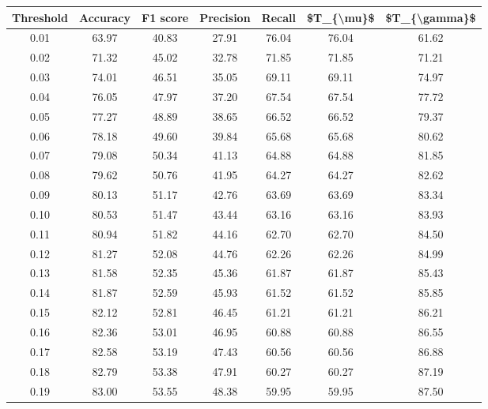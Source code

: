 \begin{tabular}{|c|c|c|c|c|c|c|}
\toprule
 Threshold &  Accuracy &  F1 score &  Precision &  Recall &  \$T\_\{\textbackslash mu\}\$ &  \$T\_\{\textbackslash gamma\}\$ \\
\hline
      0.01 &     63.97 &     40.83 &      27.91 &   76.04 &      76.04 &         61.62 \\
      0.02 &     71.32 &     45.02 &      32.78 &   71.85 &      71.85 &         71.21 \\
      0.03 &     74.01 &     46.51 &      35.05 &   69.11 &      69.11 &         74.97 \\
      0.04 &     76.05 &     47.97 &      37.20 &   67.54 &      67.54 &         77.72 \\
      0.05 &     77.27 &     48.89 &      38.65 &   66.52 &      66.52 &         79.37 \\
      0.06 &     78.18 &     49.60 &      39.84 &   65.68 &      65.68 &         80.62 \\
      0.07 &     79.08 &     50.34 &      41.13 &   64.88 &      64.88 &         81.85 \\
      0.08 &     79.62 &     50.76 &      41.95 &   64.27 &      64.27 &         82.62 \\
      0.09 &     80.13 &     51.17 &      42.76 &   63.69 &      63.69 &         83.34 \\
      0.10 &     80.53 &     51.47 &      43.44 &   63.16 &      63.16 &         83.93 \\
      0.11 &     80.94 &     51.82 &      44.16 &   62.70 &      62.70 &         84.50 \\
      0.12 &     81.27 &     52.08 &      44.76 &   62.26 &      62.26 &         84.99 \\
      0.13 &     81.58 &     52.35 &      45.36 &   61.87 &      61.87 &         85.43 \\
      0.14 &     81.87 &     52.59 &      45.93 &   61.52 &      61.52 &         85.85 \\
      0.15 &     82.12 &     52.81 &      46.45 &   61.21 &      61.21 &         86.21 \\
      0.16 &     82.36 &     53.01 &      46.95 &   60.88 &      60.88 &         86.55 \\
      0.17 &     82.58 &     53.19 &      47.43 &   60.56 &      60.56 &         86.88 \\
      0.18 &     82.79 &     53.38 &      47.91 &   60.27 &      60.27 &         87.19 \\
      0.19 &     83.00 &     53.55 &      48.38 &   59.95 &      59.95 &         87.50 \\

\end{tabular}
